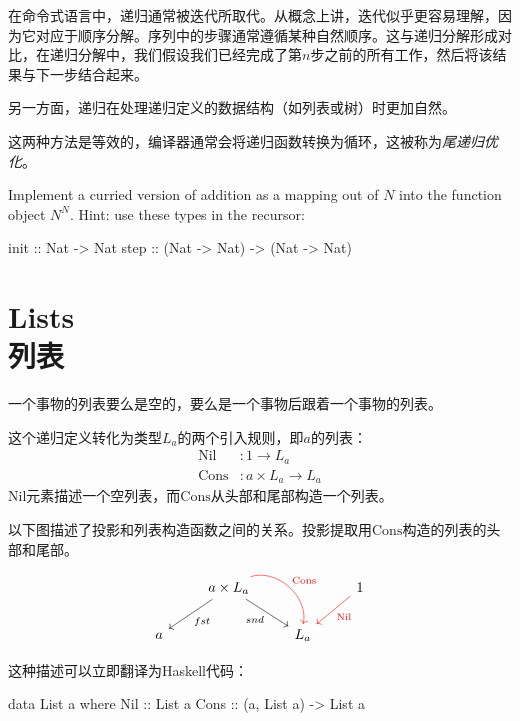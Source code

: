 \documentclass[DaoFP]{subfiles}
\begin{document}
    在命令式语言中，递归通常被迭代所取代。从概念上讲，迭代似乎更容易理解，因为它对应于顺序分解。序列中的步骤通常遵循某种自然顺序。这与递归分解形成对比，在递归分解中，我们假设我们已经完成了第$n$步之前的所有工作，然后将该结果与下一步结合起来。

    另一方面，递归在处理递归定义的数据结构（如列表或树）时更加自然。

    这两种方法是等效的，编译器通常会将递归函数转换为循环，这被称为\emph{尾递归优化}。

    \begin{exercise}
        Implement a curried version of addition as a mapping out of $N$ into the function object $N^N$. Hint: use these types in the recursor:
        \begin{haskell}
            init :: Nat -> Nat
            step :: (Nat -> Nat) -> (Nat -> Nat)
        \end{haskell}

    \end{exercise}

    \section{Lists\\列表}

    一个事物的列表要么是空的，要么是一个事物后跟着一个事物的列表。

    这个递归定义转化为类型$L_a$的两个引入规则，即$a$的列表：
    \begin{align*}
        \text{Nil} &\colon 1 \to L_a \\
        \text{Cons} &\colon a \times L_a \to L_a
    \end{align*}
    $\text{Nil}$元素描述一个空列表，而$\text{Cons}$从头部和尾部构造一个列表。

    以下图描述了投影和列表构造函数之间的关系。投影提取用$\text{Cons}$构造的列表的头部和尾部。
    \[
        \begin{tikzcd}
            & a \times L_a
            \arrow[ld, "fst"]
            \arrow[rd,  "snd"']
            \arrow[rd, bend left=60, red, "\text{Cons}"]
            && 1
            \arrow[ld, red, "\text{Nil}"]
            \\
            a
            &&L_a
        \end{tikzcd}
    \]

    这种描述可以立即翻译为Haskell代码：
    \begin{haskell}
        data List a where
        Nil  :: List a
        Cons :: (a, List a) -> List a
    \end{haskell}
\end{document}
